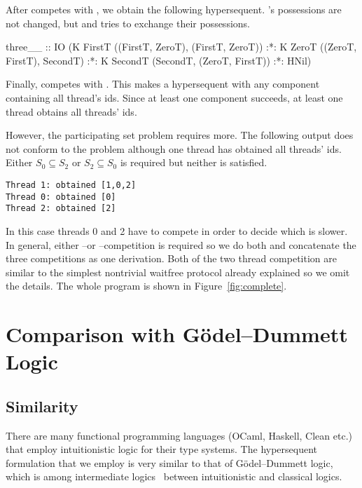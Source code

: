 After \verb@SecondT@ competes with \verb@ZeroT@, we obtain the following
hypersequent.  \verb@FirstT@'s possessions are not changed, but \verb@ZeroT@ and
\verb@SecondT@ tries to exchange their possessions.
\begin{spec}
three__ :: IO
  (K FirstT ((FirstT, ZeroT), (FirstT, ZeroT)) :*:
   K ZeroT ((ZeroT, FirstT), SecondT) :*:
   K SecondT (SecondT, (ZeroT, FirstT)) :*: HNil)
\end{spec}
Finally, \verb@SecondT@ competes with \verb@FirstT@.  This makes a hypersequent with
any component containing all thread's ids.  Since at least one component succeeds,
at least one thread obtains all threads' ids.

However, the participating set problem requires more.  The following
output does not conform to the problem although one thread has obtained
all threads' ids.  Either $S_0 \subseteq S_2$ or $S_2\subseteq S_0$ is
required but neither is satisfied.
\begin{verbatim}
Thread 1: obtained [1,0,2]
Thread 0: obtained [0]
Thread 2: obtained [2]
\end{verbatim}
In this case threads 0 and 2 have to compete in order to decide which
is slower.  In general, either \verb@ZeroT@--\verb@SecondT@ or
\verb@FirstT@--\verb@SecondT@ competition is required so we do both and
concatenate the three competitions as one derivation.
Both of the two thread competition are similar to the simplest nontrivial
waitfree protocol already explained so we omit the details.  The whole
program is shown in Figure~\ref{fig:complete}.


\section{Comparison with G\"odel--Dummett Logic}


\subsection{Similarity}

There are many functional programming languages (OCaml, Haskell, Clean
etc.) that employ intuitionistic logic for their type systems.
The hypersequent formulation that we employ is very similar to that of
G\"odel--Dummett logic, which is among
intermediate logics~\citep{umezawa} between intuitionistic and
classical logics.

